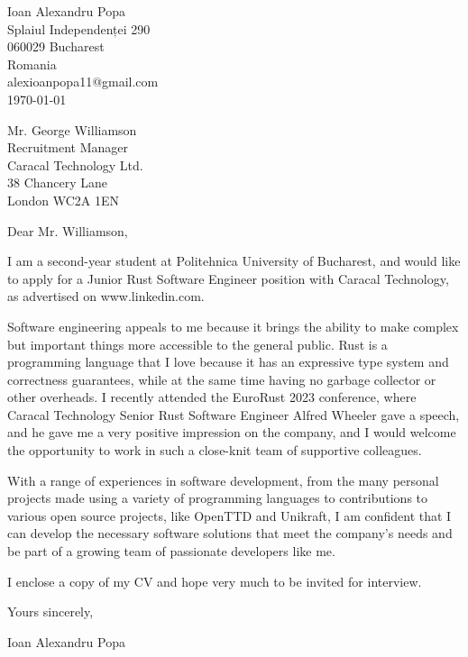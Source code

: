 \documentclass[parskip=yes]{scrartcl}
\begin{document}
\begin{flushright}
	Ioan Alexandru Popa \\ Splaiul Independenței 290 \\ 060029 Bucharest \\ Romania \\ alexioanpopa11@gmail.com \\ \today
\end{flushright}
\begin{flushleft}
Mr. George Williamson \\ Recruitment Manager \\ Caracal Technology Ltd. \\ 38 Chancery Lane \\ London WC2A 1EN
\end{flushleft}

Dear Mr. Williamson,

I am a second-year student at Politehnica University of Bucharest, and would like to apply for a Junior Rust Software Engineer position with Caracal Technology, as advertised on www.linkedin.com.

Software engineering appeals to me because it brings the ability to make complex but important things more accessible to the general public. Rust is a programming language that I love because it has an expressive type system and correctness guarantees, while at the same time having no garbage collector or other overheads. I recently attended the EuroRust 2023 conference, where Caracal Technology Senior Rust Software Engineer Alfred Wheeler gave a speech, and he gave me a very positive impression on the company, and I would welcome the opportunity to work in such a close-knit team of supportive colleagues.

With a range of experiences in software development, from the many personal projects made using a variety of programming languages to contributions to various open source projects, like OpenTTD and Unikraft, I am confident that I can develop the necessary software solutions that meet the company's needs and be part of a growing team of passionate developers like me.

I enclose a copy of my CV and hope very much to be invited for interview.

Yours sincerely,

Ioan Alexandru Popa
\end{document}
